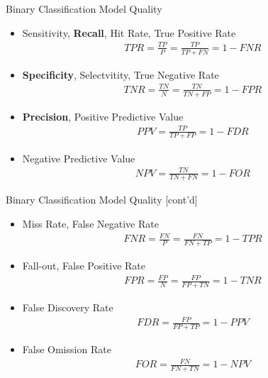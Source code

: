 \documentclass[ignorenonframetext,xcolor=x11names]{beamer}
\begin{document}
\begin{frame}[label=full]{Binary Classification Model Quality}
\begin{itemize}
   \item Sensitivity, \textbf{Recall}, Hit Rate, True Positive Rate
\begin{align*}
TPR = \frac{TP}{P} = \frac{TP}{TP+FN} = 1 - FNR
\end{align*}
   \item \textbf{Specificity}, Selectvitity, True Negative Rate
\begin{align*}
TNR = \frac{TN}{N} = \frac{TN}{TN+FP} = 1 - FPR
\end{align*}
   \item \textbf{Precision}, Positive Predictive Value
\begin{align*}
PPV = \frac{TP}{TP+FP} = 1 - FDR
\end{align*}
   \item Negative Predictive Value
\begin{align*}
NPV = \frac{TN}{TN+FN} = 1 - FOR
\end{align*}
\end{itemize}
\end{frame}

\begin{frame}[label=full]{Binary Classification Model Quality \small [cont'd]}
\begin{itemize}
   \item Miss Rate, False Negative Rate
\begin{align*}
FNR = \frac{FN}{P} = \frac{FN}{FN + TP} = 1 - TPR
\end{align*}
   \item Fall-out, False Positive Rate
\begin{align*}
FPR = \frac{FP}{N} = \frac{FP}{FP+TN} = 1 - TNR
\end{align*}
   \item False Discovery Rate
\begin{align*}
FDR = \frac{FP}{FP+TP} = 1 - PPV
\end{align*}
   \item False Omission Rate
\begin{align*}
FOR = \frac{FN}{FN+TN} = 1 - NPV
\end{align*}
\end{itemize}
\end{frame}      
\end{document}
